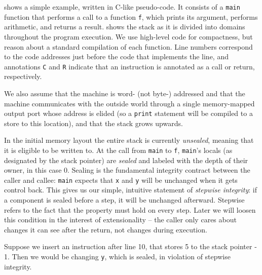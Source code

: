 \documentclass[acmsmall,review,anonymous]{acmart}\settopmatter{printfolios=true,printccs=false,printacmref=false}
\begin{document}
 shows a simple example, written in C-like pseudo-code.
It consists of a {\tt main} function that performs a call to a function {\tt f},
which prints its argument, performs arithmetic, and returns a result.
 shows the stack as it is divided into domains throughout
the program execution. We use high-level code for compactness, but reason about
a standard compilation of each function. Line numbers correspond to the code
addresses just before the code that implements the line, and annotations
{\tt C} and {\tt R} indicate that an instruction is annotated as a call or
return, respectively.

We also assume that the machine is word- (not byte-) addressed and that the
machine communicates with the outside world through a single memory-mapped
output port whose address is elided (so a {\tt print} statement will be
compiled to a store to this location), and that the stack grows upwards.

In the initial memory layout the entire stack is currently {\em unsealed},
meaning that it is eligible to be written to. At the call from {\tt main} to
{\tt f}, {\tt main}'s locals (as designated by the stack pointer) are
{\em sealed} and labeled with the depth of their owner, in this case 0.
Sealing is the fundamental integrity contract between the caller and callee:
{\tt main} expects that {\tt x} and {\tt y} will be unchanged when it gets control back.
This gives us our simple, intuitive statement of {\em stepwise integrity}:
if a component is sealed before a step, it will be unchanged afterward. Stepwise
refers to the fact that the property must hold on every step. Later we will
loosen this condition in the interest of extensionality -- the caller only
cares about changes it can see after the return, not changes during execution.

Suppose we insert an instruction after line 10, that stores 5 to the stack pointer - 1.
Then we would be changing {\tt y}, which is sealed, in violation of stepwise integrity.
\end{document}
